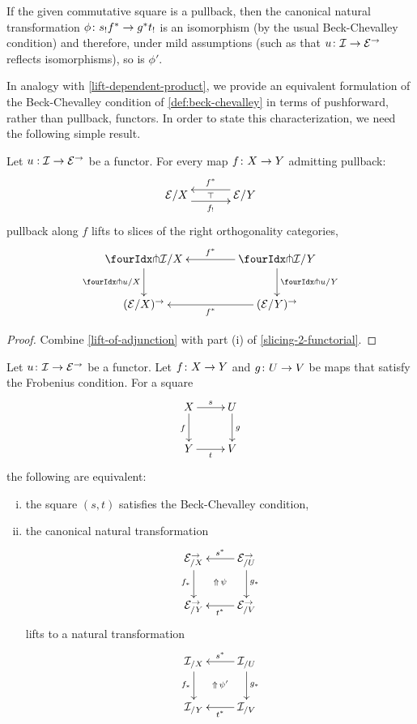 \documentclass[reqno,10pt,a4paper,oneside,draft]{amsart}
\begin{document}
\begin{remark}
If the given commutative square is a pullback, then the canonical natural transformation $\phi \colon s_! f^* \to g^* t_!$ is an isomorphism (by the usual Beck-Chevalley condition) and therefore, under mild assumptions (such as that $u \colon \mathcal{I} \to \mathcal{E}^\to$ reflects isomorphisms), so is $\phi'$.
\end{remark}

In analogy with \cref{lift-dependent-product}, we provide an equivalent formulation of the Beck-Chevalley condition of \cref{def:beck-chevalley} in terms of pushforward, rather than pullback, functors.
In order to state this characterization, we need the following simple result.

\begin{lemma} \label{lift-pullback}
Let $u : \mathcal{I} \to \mathcal{E}^\to$ be a functor.
For every map $f \colon X \to Y$ admitting pullback:
\[
\xymatrix@C+1em{
  \catE/X
  \ar@<-5pt>[r]_{f_!}
  \ar@{}[r]|{\top}
&
  \catE/Y
  \ar@<-5pt>[l]_{f^*}
}
\]
pullback along $f$ lifts to slices of the right orthogonality categories,
\[
\xymatrix@C=1.5cm{
  \liftr{\cal{I}}/X
  \ar[d]_{\liftr{u}/X}
&
  \liftr{\cal{I}}/Y
  \ar[l]_{f^*}
  \ar[d]^{\liftr{u}/Y}
\\
  (\catE/X)^\to
&
  (\catE/Y)^\to
  \ar[l]^{f^*}
}
\]
\end{lemma}

\begin{proof}
Combine \cref{lift-of-adjunction} with part (i) of \cref{slicing-2-functorial}.
\end{proof}




\begin{proposition} \label{lift-pushforward-BC}
Let $u \colon \mathcal{I} \to \mathcal{E}^\to$ be a functor.
Let $f \colon X \to Y$ and $g \colon U \to V$ be maps that satisfy the Frobenius condition.
For a square
\[
\xymatrix{
  X
  \ar[d]_{f}
  \ar[r]^{s}
&
  U
  \ar[d]^{g}
\\
  Y
  \ar[r]_{t}
&
  V
}
\]
the following are equivalent:
\begin{enumerate}[(i)]
\item the square $(s,t)$ satisfies the Beck-Chevalley condition,
\item the canonical natural transformation
\[
\xymatrix{
  \catE^\to_{/X}
  \ar[d]_{f_*}
  \ar@{}[dr]|{\Uparrow \, \psi}
&
  \catE^\to_{/U} \ar[d]^{g_*} \ar[l]_{s^*}
\\
  \catE^\to_{/Y}
&
  \catE^\to_{/V}
  \ar[l]^{t^*}
}
\]
lifts to a natural transformation
\[
\xymatrix{
  \cal{I}_{/X}
  \ar[d]_{f_*}
  \ar@{}[dr]|{\Uparrow \, \psi'}
&
  \cal{I}_{/U} \ar[d]^{g_*} \ar[l]_{s^*}
\\
  \cal{I}_{/Y}
&
  \cal{I}_{/V}
  \ar[l]^{t^*}
}
\]

\end{enumerate}
\end{proposition}
\end{document}
